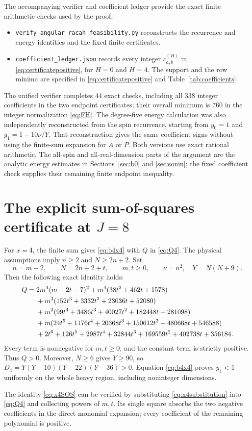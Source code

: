 \documentclass[11pt]{article}
\theoremstyle{remark}
\numberwithin{equation}{section}
\begin{document}
The accompanying verifier and coefficient ledger provide the exact finite
arithmetic checks used by the proof:
\begin{itemize}
 \item \texttt{verify\_angular\_racah\_feasibility.py} reconstructs the
 recurrence and energy identities and the fixed finite certificates.
 \item \texttt{coefficient\_ledger.json} records every integer
 $c^{(H)}_{a,b}$ in \eqref{eq:certificatepositive}, for $H=0$ and $H=4$.
 The support and the row minima are specified in
 \eqref{eq:certificatepositive} and Table~\ref{tab:coefficients}.
\end{itemize}
The unified verifier completes 44 exact checks, including all 338 integer
coefficients in the two endpoint certificates; their overall minimum is
$760$ in the integer normalization \eqref{eq:FH}.
The degree-five energy calculation was also independently reconstructed from
the spin recurrence, starting from $y_0=1$ and $y_1=1-10\nu/Y$.
That reconstruction gives the same coefficient signs without using the
finite-sum expansion for $A$ or $P$. Both versions use exact rational
arithmetic. The all-spin and all-real-dimension parts of the argument are
the analytic energy estimates in Sections~\ref{sec:b0} and
\ref{sec:sonin}; the fixed coefficient check supplies their remaining
finite endpoint inequality.

\appendix
\section{The explicit sum-of-squares certificate at \texorpdfstring{$J=8$}{J=8}}
\label{app:x4}

For $x=4$, the finite sum gives \eqref{eq:b4x4} with $Q$ in
\eqref{eq:Q4}. The physical assumptions imply $n\ge2$ and $N\ge2n+2$.
Set
\begin{equation}
 n=m+2,\qquad N=2n+2+t,\qquad m,t\ge0,
 \qquad \nu=n^2,\quad Y=N(N+9).
 \label{eq:x4substitution}
\end{equation}
Then the following exact identity holds:
\begin{align}
 Q={}&2m^4(m-2t-7)^2+m^4(38t^2+462t+1578)\notag\\
 &+m^3(152t^3+3332t^2+23036t+52080)\notag\\
 &+m^2(99t^4+3486t^3+40027t^2+182448t+281098)\notag\\
 &+m(24t^5+1176t^4+20368t^3+150612t^2+480668t+546588)\notag\\
 &+2t^6+126t^5+2987t^4+32844t^3+169559t^2+402738t+356184.
 \label{eq:x4SOS}
\end{align}
Every term is nonnegative for $m,t\ge0$, and the constant term is strictly
positive. Thus $Q>0$. Moreover, $N\ge6$ gives $Y\ge90$, so
$D_4=Y(Y-10)(Y-22)(Y-36)>0$. Equation \eqref{eq:b4x4} proves $y_4<1$
uniformly on the whole heavy region, including noninteger dimensions.

The identity \eqref{eq:x4SOS} can be verified by substituting
\eqref{eq:x4substitution} into \eqref{eq:Q4} and collecting powers of
$m,t$. Its single square absorbs the two negative coefficients in the
direct monomial expansion; every coefficient of the remaining polynomial
is positive.
\end{document}
